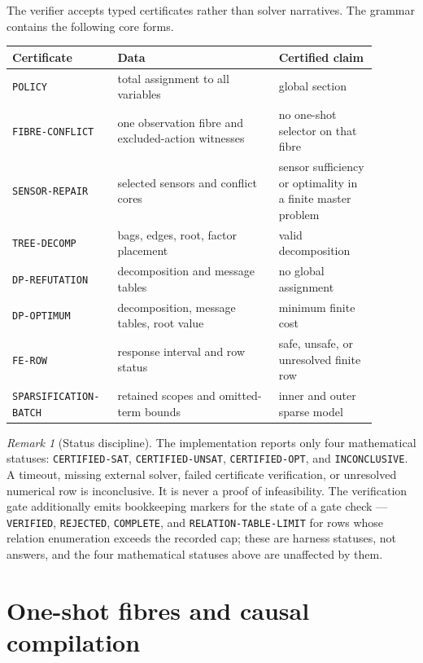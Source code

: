 \documentclass[11pt]{article}
\theoremstyle{plain}
\theoremstyle{definition}
\theoremstyle{remark}
\newtheorem{remark}[theorem]{Remark}
\begin{document}
The verifier accepts typed certificates rather than solver narratives.  The
grammar contains the following core forms.

\begin{center}
\begin{tabular}{@{}p{0.23\linewidth}p{0.41\linewidth}p{0.25\linewidth}@{}}
\toprule
Certificate & Data & Certified claim\\
\midrule
\texttt{POLICY} & total assignment to all variables & global section\\
\texttt{FIBRE-CONFLICT} & one observation fibre and excluded-action witnesses & no one-shot selector on that fibre\\
\texttt{SENSOR-REPAIR} & selected sensors and conflict cores & sensor sufficiency or optimality in a finite master problem\\
\texttt{TREE-DECOMP} & bags, edges, root, factor placement & valid decomposition\\
\texttt{DP-REFUTATION} & decomposition and message tables & no global assignment\\
\texttt{DP-OPTIMUM} & decomposition, message tables, root value & minimum finite cost\\
\texttt{FE-ROW} & response interval and row status & safe, unsafe, or unresolved finite row\\
\texttt{SPARSIFICATION-\allowbreak BATCH} & retained scopes and omitted-term bounds & inner and outer sparse model\\
\bottomrule
\end{tabular}
\end{center}

\begin{remark}[Status discipline]
\label{rem:status-discipline}
The implementation reports only four mathematical statuses:
\texttt{CERTIFIED-SAT}, \texttt{CERTIFIED-UNSAT}, \texttt{CERTIFIED-OPT}, and
\texttt{INCONCLUSIVE}.  A timeout, missing external solver, failed certificate
verification, or unresolved numerical row is inconclusive.  It is never a proof
of infeasibility.  The verification gate additionally emits bookkeeping
markers for the state of a gate check --- \texttt{VERIFIED},
\texttt{REJECTED}, \texttt{COMPLETE}, and \texttt{RELATION-TABLE-LIMIT} for
rows whose relation enumeration exceeds the recorded cap; these are harness
statuses, not answers, and the four mathematical statuses above are unaffected
by them.
\end{remark}

\section{One-shot fibres and causal compilation}
\label{sec:fibres-compilation}
\end{document}
